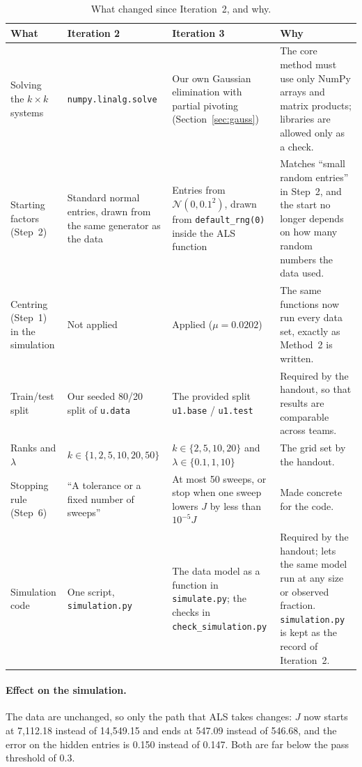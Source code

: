 \documentclass[11pt]{article}
\theoremstyle{definition}
\newcommand{\code}[1]{\texttt{#1}}
\begin{document}
\begin{table}[htbp]
\centering
\small
\begin{tabular}{@{}>{\raggedright}p{2.3cm}>{\raggedright}p{3.5cm}>{\raggedright}p{4.2cm}>{\raggedright\arraybackslash}p{5.0cm}@{}}
\toprule
What & Iteration 2 & Iteration 3 & Why \\
\midrule
Solving the $k\times k$ systems & \code{numpy.linalg.solve} & Our own Gaussian elimination
  with partial pivoting (Section~\ref{sec:gauss}) & The core method must use only NumPy arrays and
  matrix products; libraries are allowed only as a check. \\
\addlinespace
Starting factors (Step~2) & Standard normal entries, drawn from the same generator as the data
  & Entries from $\mathcal N(0, 0.1^2)$, drawn from \code{default\_rng(0)} inside the ALS function
  & Matches ``small random entries'' in Step~2, and the start no longer depends on how many random
  numbers the data used. \\
\addlinespace
Centring (Step~1) in the simulation & Not applied & Applied ($\mu = 0.0202$) & The same
  functions now run every data set, exactly as Method~2 is written. \\
\addlinespace
Train/test split & Our seeded 80/20 split of \code{u.data} & The provided split
  \code{u1.base} / \code{u1.test} & Required by the handout, so that results are comparable across
  teams. \\
\addlinespace
Ranks and $\lambda$ & $k \in \{1,2,5,10,20,50\}$ & $k \in \{2,5,10,20\}$ and
  $\lambda \in \{0.1, 1, 10\}$ & The grid set by the handout. \\
\addlinespace
Stopping rule (Step~6) & ``A tolerance or a fixed number of sweeps'' & At most 50 sweeps, or stop
  when one sweep lowers $J$ by less than $10^{-5}J$ & Made concrete for the code. \\
\addlinespace
Simulation code & One script, \code{simulation.py} & The data model as a function in
  \code{simulate.py}; the checks in \code{check\_simulation.py} & Required by the handout; lets the
  same model run at any size or observed fraction. \code{simulation.py} is kept as the record of
  Iteration~2. \\
\bottomrule
\end{tabular}
\caption{What changed since Iteration~2, and why.}
\label{tab:changes}
\end{table}

\paragraph{Effect on the simulation.} The data are unchanged, so only the path that ALS takes
changes: $J$ now starts at 7{,}112.18 instead of 14{,}549.15 and ends at 547.09 instead of 546.68,
and the error on the hidden entries is 0.150 instead of 0.147. Both are far below the pass
threshold of 0.3.
\end{document}
